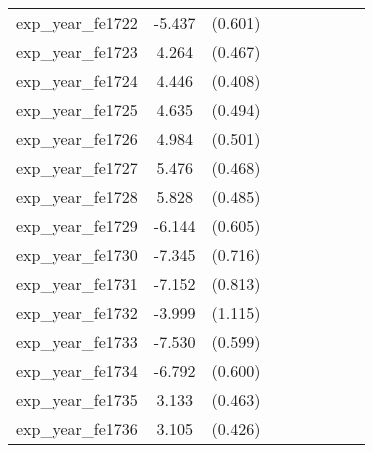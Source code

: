 {\begin{tabular}{l*{4}{cc}}
exp\_year\_fe1722&   -5.437\sym{***}&  (0.601)&                  &         &                  &         &                  &         \\
exp\_year\_fe1723&    4.264\sym{***}&  (0.467)&                  &         &                  &         &                  &         \\
exp\_year\_fe1724&    4.446\sym{***}&  (0.408)&                  &         &                  &         &                  &         \\
exp\_year\_fe1725&    4.635\sym{***}&  (0.494)&                  &         &                  &         &                  &         \\
exp\_year\_fe1726&    4.984\sym{***}&  (0.501)&                  &         &                  &         &                  &         \\
exp\_year\_fe1727&    5.476\sym{***}&  (0.468)&                  &         &                  &         &                  &         \\
exp\_year\_fe1728&    5.828\sym{***}&  (0.485)&                  &         &                  &         &                  &         \\
exp\_year\_fe1729&   -6.144\sym{***}&  (0.605)&                  &         &                  &         &                  &         \\
exp\_year\_fe1730&   -7.345\sym{***}&  (0.716)&                  &         &                  &         &                  &         \\
exp\_year\_fe1731&   -7.152\sym{***}&  (0.813)&                  &         &                  &         &                  &         \\
exp\_year\_fe1732&   -3.999\sym{***}&  (1.115)&                  &         &                  &         &                  &         \\
exp\_year\_fe1733&   -7.530\sym{***}&  (0.599)&                  &         &                  &         &                  &         \\
exp\_year\_fe1734&   -6.792\sym{***}&  (0.600)&                  &         &                  &         &                  &         \\
exp\_year\_fe1735&    3.133\sym{***}&  (0.463)&                  &         &                  &         &                  &         \\
exp\_year\_fe1736&    3.105\sym{***}&  (0.426)&                  &         &                  &         &                  &         \\

\end{tabular}}

